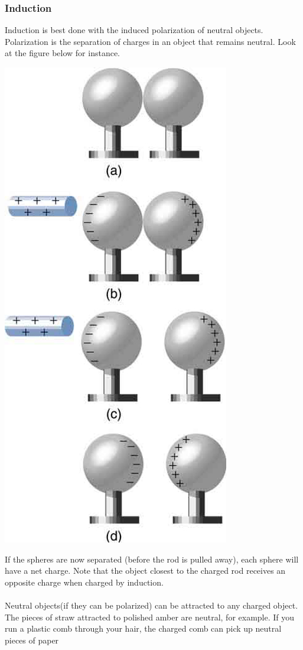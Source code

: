 \documentclass[9pt]{article}
\begin{document}
	\subsubsection*{Induction}	 
	Induction is best done with the induced polarization of neutral objects. Polarization is the separation of charges in an object that remains neutral. Look at the figure below for instance.
	\begin{center}
		\includegraphics[scale=0.4]{induction}
	\end{center}If the spheres are now separated (before the rod is pulled away), each sphere will have a net charge. Note that the object closest to the charged rod receives an opposite charge when charged by induction. \\ \\
	Neutral objects(if they can be polarized) can be attracted to any charged object. The pieces of straw attracted to polished amber are neutral, for example. If you run a plastic comb through your hair, the charged comb can pick up neutral pieces of paper
\end{document}
